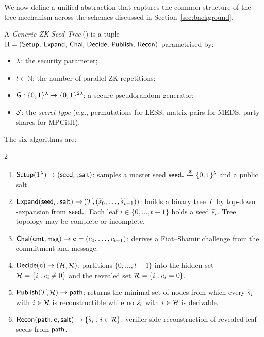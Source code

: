 
We now define a unified abstraction that captures the common structure
of the \GGM-tree mechanism across the schemes discussed in
Section~\ref{sec:background}.

\begin{definition}[\GZKST]
\label{def:gzkst}
A \emph{Generic ZK Seed Tree} (\GZKST) is a tuple
$\Pi = (\mathsf{Setup},\,\allowbreak \mathsf{Expand},\, \mathsf{Chal},\, \mathsf{Decide},\, \mathsf{Publish},\, \mathsf{Recon})$
parametrised by:
\begin{itemize}
  \item $\lambda$: the security parameter;
  \item $t \in \mathbb{N}$: the number of parallel ZK repetitions;
  \item $\mathsf{G} : \{0,1\}^{\lambda} \to \{0,1\}^{2\lambda}$: a secure pseudorandom generator;
  \item $\mathcal{S}$: the \emph{secret type}
        (e.g., permutations for LESS, matrix pairs for MEDS, party shares for MPCitH).
\end{itemize}
The six algorithms are:
\begin{multicols}{2}
\begin{enumerate}[leftmargin=*]
  \item $\mathsf{Setup}(1^{\lambda}) \to (\mathsf{seed}_r,\mathsf{salt})$:
        samples a master seed $\mathsf{seed}_r \mathrel{\xleftarrow{\$}} \{0,1\}^{\lambda}$
        and a public salt.

  \item $\mathsf{Expand}(\mathsf{seed}_r,\mathsf{salt})
        \to (\mathcal{T},(\widetilde{s}_0,\ldots,\widetilde{s}_{t-1}))$:
        builds a binary tree $\mathcal{T}$ by top-down
        \PRG-expansion from $\mathsf{seed}_r$. Each leaf
        $i\in\{0,\ldots,t-1\}$ holds a seed $\widetilde{s}_i$.
        Tree topology may be complete or incomplete.

  \item $\mathsf{Chal}(\mathsf{cmt},\mathsf{msg})
        \to \mathbf{c}=(c_0,\ldots,c_{t-1})$:
        derives a Fiat--Shamir challenge from the
        commitment and message.

  \item $\mathsf{Decide}(\mathbf{c})
        \to (\mathcal{H},\mathcal{R})$:
        partitions $\{0,\ldots,t-1\}$ into the hidden
        set $\mathcal{H}=\{i:c_i\neq0\}$ and the revealed
        set $\mathcal{R}=\{i:c_i=0\}$.

  \item $\mathsf{Publish}(\mathcal{T},\mathcal{H})\to\mathsf{path}$:
        returns the minimal set of nodes from which
        every $\widetilde{s}_i$ with $i\in\mathcal{R}$ is
        reconstructible while no $\widetilde{s}_i$ with
        $i\in\mathcal{H}$ is derivable.

  \item $\mathsf{Recon}(\mathsf{path},\mathbf{c},\mathsf{salt})
        \to \{\widetilde{s}_i:i\in\mathcal{R}\}$:
        verifier-side reconstruction of revealed
        leaf seeds from $\mathsf{path}$.
\end{enumerate}
\end{multicols}
\end{definition}

